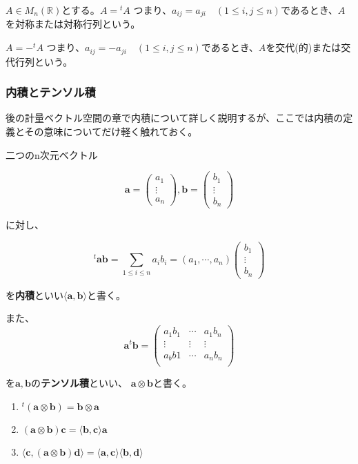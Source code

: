 \documentclass[dvipdfmx,autodetect-engine]{jsarticle}
\newcommand{\innerProduct}[2]{\langle \bm{#1}, \bm{#2} \rangle}
\newcommand{\tensorProduct}[2]{\bm{#1} \otimes \bm{#2}}
\begin{document}
$A \in M_n(\mathbb{R})$とする。$A = {}^t\!A$ つまり、$a_{ij} = a_{ji} \quad (1 \leq i, j \leq n)$であるとき、$A$を対称または対称行列という。

$A = -{}^t\!A$ つまり、$a_{ij} = -a_{ji} \quad (1 \leq i, j \leq n)$であるとき、$A$を交代(的)または交代行列という。

\subsubsection{内積とテンソル積}

後の計量ベクトル空間の章で内積について詳しく説明するが、ここでは内積の定義とその意味についてだけ軽く触れておく。

二つのn次元ベクトル

$$
\bm{a} = \begin{pmatrix}
a_1 \\
\vdots \\
a_n
\end{pmatrix}, 
\bm{b} = \begin{pmatrix}
b_1 \\
\vdots \\
b_n
\end{pmatrix}
$$

に対し、


$$
{}^t\!\bm{a}\bm{b} = \sum_{1 \leq i \leq n} a_ib_i = (a_1, \cdots, a_n)\begin{pmatrix}
b_1 \\
\vdots \\
b_n
\end{pmatrix}
$$

を{\bf 内積}といい$\langle \bm{a}, \bm{b} \rangle$と書く。

また、
$$
\bm{a}{}^t\!\bm{b} = \begin{pmatrix}
a_1b_1 & \cdots & a_1b_n \\
\vdots & \vdots & \vdots \\
a_bb1 & \cdots & a_nb_n \\
\end{pmatrix}
$$

を$\bm{a}, \bm{b}$の{\bf テンソル積}といい、 $\bm{a} \otimes \bm{b}$と書く。


\begin{enumerate}
\renewcommand{\labelenumi}{(\arabic{enumi})}
\item ${}^t(\tensorProduct{a}{b}) = \tensorProduct{b}{a}$
\item $(\tensorProduct{a}{b})\bm{c} = \innerProduct{b}{c}\bm{a}$
\item $\innerProduct{c}{(\tensorProduct{a}{b})\bm{d}} = \innerProduct{a}{c}\innerProduct{b}{d}$
\end{enumerate}
\end{document}

